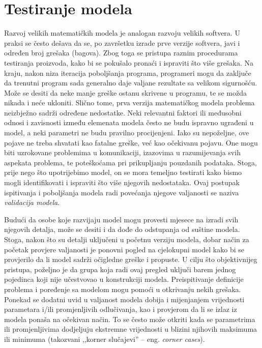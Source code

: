 \documentclass[b5paper, utf8, 11pt, colorlinks]{book}
\theoremstyle{definition}
\begin{document}


\section{Testiranje modela}
 
Razvoj velikih matematičkih modela je analogan razvoju velikih softvera. U praksi se često dešava da se, po završetku izrade prve verzije softvera, javi i određen broj grešaka (bagova). Zbog toga se pristupa raznim procedurama testiranja proizvoda, kako bi se pokušalo pronaći i
ispraviti što više grešaka. Na kraju, nakon niza iteracija poboljšanja programa, programeri mogu da zaključe da trenutni program sada generalno daje  valjane rezultate sa velikom sigurnošću. Može se desiti da neke manje greške ostanu skrivene u programu, te se možda   nikada i neće ukloniti. Slično tome, prva verzija matematičkog modela problema neizbježno sadrži određene
nedostatke. Neki relevantni faktori ili međusobni odnosi i zavisnosti između elemenata modela često ne budu  ispravno ugrađeni
u model, a neki parametri ne budu pravilno procijenjeni. Iako su nepoželjne, ove pojave ne treba shvatati kao fatalne greške, već kao očekivanu pojavu. One mogu biti uzrokovane problemima u komunikaciji, izazovima u razumijevanja svih aspekata problema, te poteškoćama pri prikupljanju pouzdanih podataka. Stoga, prije nego što upotrijebimo model, on se mora  temeljno testirati kako bismo mogli  identifikovati 
i ispraviti što više njegovih nedostataka.  Ovaj postupak ispitivanja i poboljšanja modela radi povećanja njegove valjanosti se naziva \emph{validacija modela}. 

Budući da osobe koje razvijaju model mogu provesti mjesece na izradi svih njegovih detalja, može se desiti i da dođe do odstupanja od suštine modela. Stoga, nakon što su detalji uključeni u 
početnu verziju modela, dobar način za početak provjere valjanosti je ponovni pogled na cjelokupni model kako bi se provjerilo da li model sadrži  očigledne greške i propuste. U cilju što objektivnijeg pristupa, poželjno je da grupa koja radi ovaj pregled uključi barem jednog pojedinca koji nije učestvovao u konstrukciji modela. Preispitivanje definicije
problema i poređenje sa modelom mogu pomoći u otkrivanju nekih  grešaka.  Ponekad se  dodatni uvid u valjanost modela dobija i 
mijenjanjem vrijednosti parametara i/ili promjenljivih odlučivanja, kao i provjerom da li se  izlaz iz modela ponaša na očekivan način. To se često može otkriti kada se parametrima ili promjenljivima dodjeljuju ekstremne vrijednosti u blizini njihovih maksimuma ili minimuma (takozvani ,,korner slučajevi'' -- eng. \textit{corner cases}). 
\end{document}
